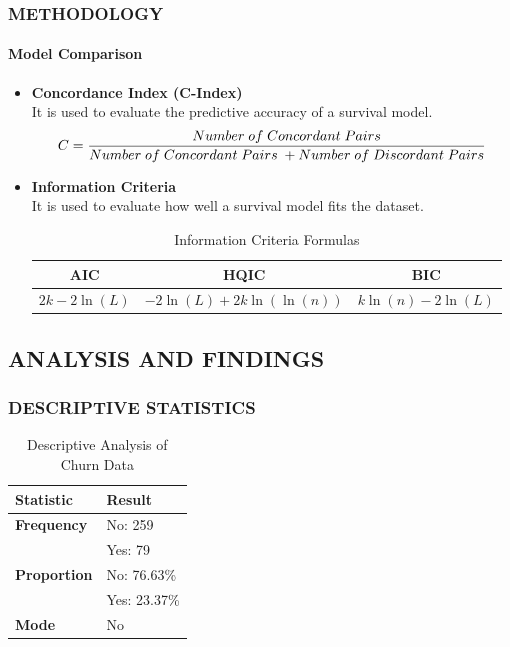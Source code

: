\documentclass[12pt]{beamer}
\begin{document}
\begin{frame}
    \frametitle{METHODOLOGY}
        \framesubtitle{Model Comparison}  

    \begin{itemize}
        \item \textbf{Concordance Index (C-Index)}\\
        It is used to evaluate the predictive accuracy of a survival model. 
        \begin{equation} \scriptsize
        C=\frac{Number\ of\ Concordant\ Pairs}{Number\ of\ Concordant\ Pairs\ +Number\ of\ Discordant\ Pairs}
        \end{equation}
        \item \textbf{Information Criteria}\\
        It is used to evaluate how well a survival model fits the dataset.
        \begin{table}[H]
        \centering
        \begin{tabular}{|c|c|c|}
        \hline
         \textbf{AIC} & \textbf{HQIC} & \textbf{BIC} \\
        \hline
         \(2k - 2\ln(L)\) & \(-2\ln(L) + 2k\ln(\ln(n))\) & \(k\ln(n) - 2\ln(L)\) \\
        \hline
        \end{tabular}
        \caption{Information Criteria Formulas}
        \label{table:info_criteria}
        \end{table}
    \end{itemize}
\end{frame}
  

	
	\begin{frame}
  	\section{ANALYSIS AND FINDINGS}

    \frametitle{DESCRIPTIVE  STATISTICS}
\begin{table}[H]
\centering
\begin{tabular}{ll}
\toprule
\textbf{Statistic} & \textbf{Result} \\ 
\midrule
\textbf{Frequency }& No: 259 \\
                         & Yes: 79 \\ 
\midrule
\textbf{Proportion} & No: 76.63\% \\ 
                    & Yes: 23.37\% \\ 
\midrule
\textbf{Mode}& No \\ 
\bottomrule
\end{tabular}
\caption{Descriptive Analysis of Churn Data}
\label{tab:churn_summary}
\end{table}

  
\end{frame}
\end{document}
